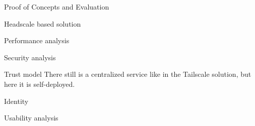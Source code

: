 \begin{frame}{Proof of Concepts and Evaluation}
\begin{block}{Headscale based solution}
\begin{block}{Performance analysis}
\protect\hypertarget{performance-analysis}{}
\end{block}

\begin{block}{Security analysis}
\protect\hypertarget{security-analysis}{}
\begin{block}{Trust model}
\protect\hypertarget{trust-model}{}
There still is a centralized service like in the Tailscale solution, but
here it is self-deployed.
\end{block}

\begin{block}{Identity}
\protect\hypertarget{identity}{}
\end{block}
\end{block}

\begin{block}{Usability analysis}
\protect\hypertarget{usability-analysis}{}
\end{block}
\end{block}
\end{frame}

